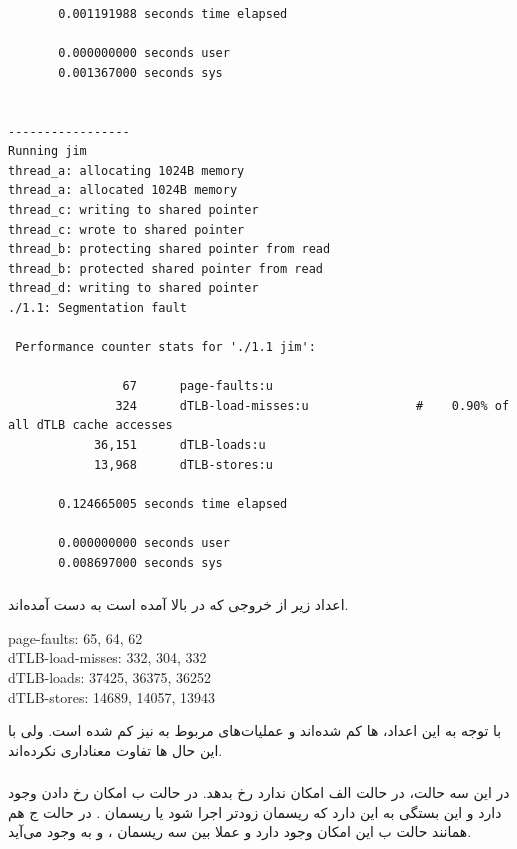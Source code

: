 \documentclass{article}
\begin{document}
\begin{latin}
\begin{lstlisting}
       0.001191988 seconds time elapsed

       0.000000000 seconds user
       0.001367000 seconds sys


-----------------
Running jim
thread_a: allocating 1024B memory
thread_a: allocated 1024B memory
thread_c: writing to shared pointer
thread_c: wrote to shared pointer
thread_b: protecting shared pointer from read
thread_b: protected shared pointer from read
thread_d: writing to shared pointer
./1.1: Segmentation fault

 Performance counter stats for './1.1 jim':

                67      page-faults:u                                                         
               324      dTLB-load-misses:u               #    0.90% of all dTLB cache accesses
            36,151      dTLB-loads:u                                                          
            13,968      dTLB-stores:u                                                         

       0.124665005 seconds time elapsed

       0.000000000 seconds user
       0.008697000 seconds sys
\end{lstlisting}
\end{latin}
\subsubsection{}
اعداد زیر از خروجی که در بالا آمده است به دست آمده‌اند. 
\begin{latin}
page-faults: 65, 64, 62 \\
dTLB-load-misses: 332, 304, 332 \\
dTLB-loads: 37425, 36375, 36252 \\
dTLB-stores: 14689, 14057, 13943
\end{latin}
با توجه به این اعداد،‌ 
ها
کم شده‌اند و عملیات‌های مربوط به 
نیز کم شده است. ولی با این حال 
ها تفاوت معناداری نکرده‌اند. 

\subsubsection{}
در این سه حالت، در حالت الف امکان ندارد 
رخ بدهد. در حالت ب امکان رخ دادن 
وجود دارد و این بستگی به این دارد که ریسمان 
زودتر اجرا شود یا ریسمان 
.
در حالت ج هم همانند حالت ب این امکان وجود دارد و عملا 
بین سه ریسمان 
،
 و 
به وجود می‌آید.
\end{document}
